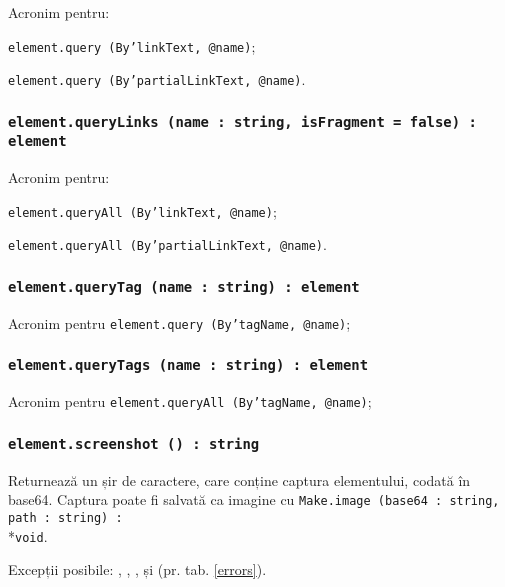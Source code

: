 Acronim pentru:
\begin{icItems}
	\item \texttt{element.query (By'linkText, @name)};
	\item \texttt{element.query (By'partialLinkText, @name)}.
\end{icItems}

\subsubsection{\texttt{element.queryLinks (name : string, isFragment = false) : element}}

Acronim pentru:
\begin{icItems}
	\item \texttt{element.queryAll (By'linkText, @name)};
	\item \texttt{element.queryAll (By'partialLinkText, @name)}.
\end{icItems}

\subsubsection{\texttt{element.queryTag (name : string) : element}}

Acronim pentru \texttt{element.query (By'tagName, @name)};

\subsubsection{\texttt{element.queryTags (name : string) : element}}

Acronim pentru \texttt{element.queryAll (By'tagName, @name)};

\subsubsection{\texttt{element.screenshot () : string}}

Returnează un șir de caractere, care conține captura elementului, codată în base64. Captura poate fi salvată ca imagine cu \texttt{Make.image (base64 : string, path : string) :}\\*\texttt{void}.

Excepții posibile: , , ,  și  (pr. tab. \ref{errors}).


